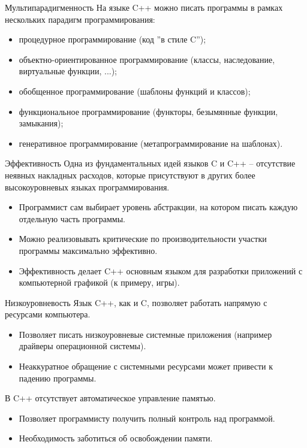 \documentclass[9pt]{beamer}
\begin{document}
\begin{frame}{Мультипарадигменность}
    На языке C++ можно писать программы в рамках нескольких
    парадигм программирования:
    \begin{itemize}
        \item процедурное программирование
        (код ”в стиле C”);
        \item объектно-ориентированное программирование
        (классы, наследование, виртуальные функции, ...);
        \item обобщенное программирование
        (шаблоны функций и классов);
        \item функциональное программирование
        (функторы, безымянные функции, замыкания);
        \item генеративное программирование
        (метапрограммирование на шаблонах).
    \end{itemize}    
\end{frame}
\begin{frame}{Эффективность}
    Одна из фундаментальных идей языков C и C++ – отсутствие
    неявных накладных расходов, которые присутствуют в других
    более высокоуровневых языках программирования.
    \begin{itemize}
        \item Программист сам выбирает уровень абстракции, на котором
        писать каждую отдельную часть программы.
        \item Можно реализовывать критические по производительности
        участки программы максимально эффективно.
        \item Эффективность делает C++ основным языком для
        разработки приложений с компьютерной графикой (к
        примеру, игры).
    \end{itemize}
\end{frame}
\begin{frame}{Низкоуровневость}
    Язык C++, как и C, позволяет работать напрямую с ресурсами
    компьютера.
    \begin{itemize}
        \item Позволяет писать низкоуровневые системные приложения
        (например драйверы операционной системы).
        \item Неаккуратное обращение с системными ресурсами может
        привести к падению программы.
    \end{itemize}
    
    В C++ отсутствует автоматическое управление памятью.
    \begin{itemize}
        \item Позволяет программисту получить полный контроль над
        программой.
        \item Необходимость заботиться об освобождении памяти.
    \end{itemize}
\end{frame}
\end{document}
